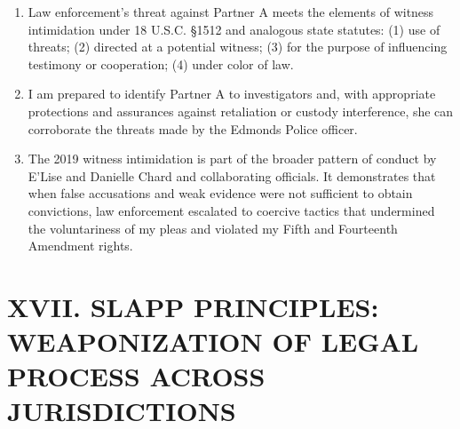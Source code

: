 \documentclass[12pt,letterpaper]{article}
\begin{document}
\begin{enumerate}
\item Law enforcement's threat against Partner A meets the elements of witness intimidation under 18 U.S.C. \S 1512 and analogous state statutes: (1) use of threats; (2) directed at a potential witness; (3) for the purpose of influencing testimony or cooperation; (4) under color of law.

\item I am prepared to identify Partner A to investigators and, with appropriate protections and assurances against retaliation or custody interference, she can corroborate the threats made by the Edmonds Police officer.

\item The 2019 witness intimidation is part of the broader pattern of conduct by E'Lise and Danielle Chard and collaborating officials. It demonstrates that when false accusations and weak evidence were not sufficient to obtain convictions, law enforcement escalated to coercive tactics that undermined the voluntariness of my pleas and violated my Fifth and Fourteenth Amendment rights.

\end{enumerate}


\section*{XVII. SLAPP PRINCIPLES: WEAPONIZATION OF LEGAL PROCESS ACROSS JURISDICTIONS}
\end{document}
